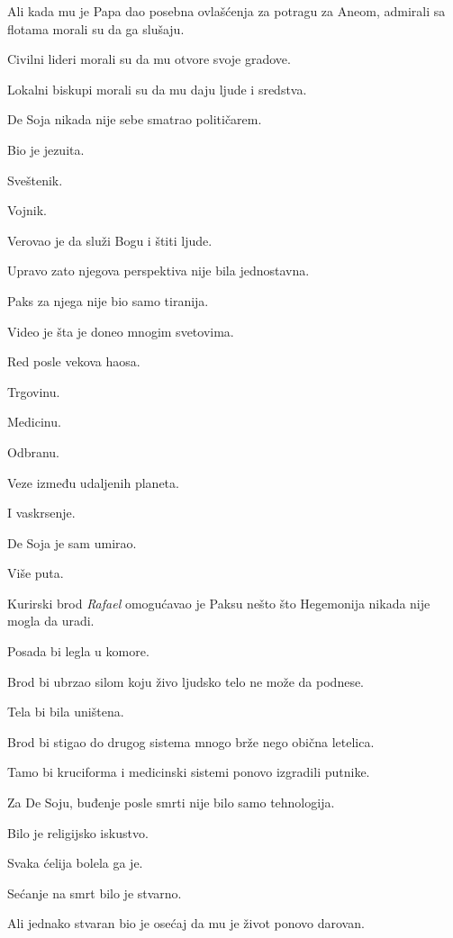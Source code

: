 Ali kada mu je Papa dao posebna ovlašćenja za potragu za Aneom, admirali sa flotama morali su da ga slušaju.

Civilni lideri morali su da mu otvore svoje gradove.

Lokalni biskupi morali su da mu daju ljude i sredstva.

\bigskip

De Soja nikada nije sebe smatrao političarem.

Bio je jezuita.

Sveštenik.

Vojnik.

Verovao je da služi Bogu i štiti ljude.

Upravo zato njegova perspektiva nije bila jednostavna.

Paks za njega nije bio samo tiranija.

Video je šta je doneo mnogim svetovima.

Red posle vekova haosa.

Trgovinu.

Medicinu.

Odbranu.

Veze između udaljenih planeta.

I vaskrsenje.

\bigskip

De Soja je sam umirao.

Više puta.

\bigskip

Kurirski brod \emph{Rafael} omogućavao je Paksu nešto što Hegemonija nikada nije mogla da uradi.

Posada bi legla u komore.

Brod bi ubrzao silom koju živo ljudsko telo ne može da podnese.

Tela bi bila uništena.

Brod bi stigao do drugog sistema mnogo brže nego obična letelica.

Tamo bi kruciforma i medicinski sistemi ponovo izgradili putnike.

\bigskip

Za De Soju, buđenje posle smrti nije bilo samo tehnologija.

Bilo je religijsko iskustvo.

Svaka ćelija bolela ga je.

Sećanje na smrt bilo je stvarno.

Ali jednako stvaran bio je osećaj da mu je život ponovo darovan.

\bigskip

